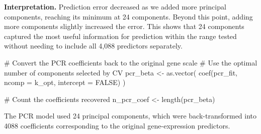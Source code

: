 \documentclass[
  letterpaper,
  DIV=11,
  numbers=noendperiod]{scrreprt}
\newenvironment{Shaded}{\begin{snugshade}}{\end{snugshade}}
\newcommand{\AttributeTok}[1]{\textcolor[rgb]{0.40,0.45,0.13}{#1}}
\newcommand{\CommentTok}[1]{\textcolor[rgb]{0.37,0.37,0.37}{#1}}
\newcommand{\ConstantTok}[1]{\textcolor[rgb]{0.56,0.35,0.01}{#1}}
\newcommand{\DecValTok}[1]{\textcolor[rgb]{0.68,0.00,0.00}{#1}}
\newcommand{\FunctionTok}[1]{\textcolor[rgb]{0.28,0.35,0.67}{#1}}
\newcommand{\NormalTok}[1]{\textcolor[rgb]{0.00,0.23,0.31}{#1}}
\newcommand{\OtherTok}[1]{\textcolor[rgb]{0.00,0.23,0.31}{#1}}
\newcommand{\SpecialCharTok}[1]{\textcolor[rgb]{0.37,0.37,0.37}{#1}}
\begin{document}
\textbf{Interpretation.} Prediction error decreased as we added more
principal components, reaching its minimum at 24 components. Beyond this
point, adding more components slightly increased the error. This shows
that 24 components captured the most useful information for prediction
within the range tested without needing to include all 4,088 predictors
separately.

\begin{Shaded}
\begin{Highlighting}[]
\CommentTok{\# Convert the PCR coefficients back to the original gene scale}
\CommentTok{\# Use the optimal number of components selected by CV}
\NormalTok{pcr\_beta }\OtherTok{\textless{}{-}} \FunctionTok{as.vector}\NormalTok{(}
  \FunctionTok{coef}\NormalTok{(pcr\_fit, }\AttributeTok{ncomp =}\NormalTok{ k\_opt, }\AttributeTok{intercept =} \ConstantTok{FALSE}\NormalTok{)}
\NormalTok{)}

\CommentTok{\# Count the coefficients recovered}
\NormalTok{n\_pcr\_coef }\OtherTok{\textless{}{-}} \FunctionTok{length}\NormalTok{(pcr\_beta)}
\end{Highlighting}
\end{Shaded}

The PCR model used 24 principal components, which were back-transformed
into 4088 coefficients corresponding to the original gene-expression
predictors.

\begin{Shaded}
\end{Shaded}
\end{document}
